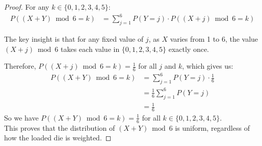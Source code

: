 \documentclass[letterpaper, 11pt]{article}
\newcommand{\1}{\mathds{1}}	%
\theoremstyle{definition}
\begin{document}
\begin{proof}
For any $k \in \{0,1,2,3,4,5\}$:
\begin{align*}
P((X+Y) \bmod 6 = k) &= \sum_{j=1}^6 P(Y=j) \cdot P((X+j) \bmod 6 = k)
\end{align*}

The key insight is that for any fixed value of $j$, as $X$ varies from 1 to 6, the value $(X+j) \bmod 6$ takes each value in $\{0,1,2,3,4,5\}$ exactly once.

Therefore, $P((X+j) \bmod 6 = k) = \frac{1}{6}$ for all $j$ and $k$, which gives us:
\begin{align*}
P((X+Y) \bmod 6 = k) &= \sum_{j=1}^6 P(Y=j) \cdot \frac{1}{6}\\
&= \frac{1}{6}\sum_{j=1}^6 P(Y=j)\\
&= \frac{1}{6}
\end{align*}
So we have $P((X+Y) \bmod 6 = k) = \frac{1}{6}$ for all $k\in \{0,1,2,3,4,5\}$.
\\This proves that the distribution of $(X+Y) \bmod 6$ is uniform, regardless of how the loaded die is weighted.
\end{proof}
\end{document}
